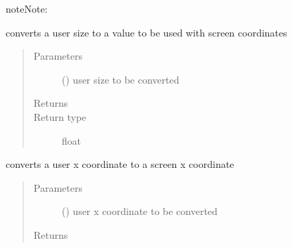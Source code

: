 \documentclass[letterpaper,10pt,english]{sphinxmanual}
\begin{document}
\begin{fulllineitems}
\begin{fulllineitems}
\begin{sphinxadmonition}{note}{Note:}
\begin{quote}
\end{quote}
\end{sphinxadmonition}

\end{fulllineitems}


\begin{fulllineitems}
\label{\detokenize{Reference:salabim.Environment.user_to_screencoordinates_size}}
converts a user size to a value to be used with screen coordinates
\begin{quote}\begin{description}
\item[{Parameters}] \leavevmode
{} () \textendash{} user size to be converted

\item[{Returns}] \leavevmode
{}

\item[{Return type}] \leavevmode
float

\end{description}\end{quote}

\end{fulllineitems}


\begin{fulllineitems}
\label{\detokenize{Reference:salabim.Environment.user_to_screencoordinates_x}}
converts a user x coordinate to a screen x coordinate
\begin{quote}\begin{description}
\item[{Parameters}] \leavevmode
{} () \textendash{} user x coordinate to be converted

\item[{Returns}] \leavevmode
{}


\end{description}
\end{quote}
\end{fulllineitems}
\end{fulllineitems}
\end{document}

